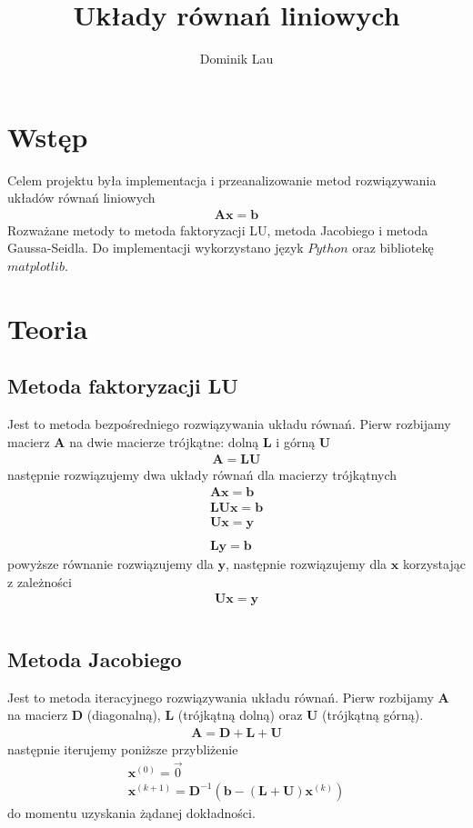 \documentclass{article}
\title{Układy równań liniowych}
\author{Dominik Lau}
\begin{document}
\maketitle
\section{Wstęp}
Celem projektu była implementacja i przeanalizowanie metod rozwiązywania układów równań liniowych
\begin{gather*}
	\boldsymbol{A}\boldsymbol{x} = \boldsymbol{b}
\end{gather*}
Rozważane metody to metoda faktoryzacji LU, metoda Jacobiego i metoda Gaussa-Seidla.  
Do implementacji wykorzystano język $Python$ oraz bibliotekę $matplotlib$.
\section{Teoria}
\subsection*{Metoda faktoryzacji LU}
Jest to metoda bezpośredniego rozwiązywania układu równań.  Pierw rozbijamy macierz $\textbf{A}$
na dwie macierze trójkątne: dolną $\textbf{L}$ i górną $\textbf{U}$
\begin{gather*}
	\boldsymbol{A} = \boldsymbol{L}\boldsymbol{U}
\end{gather*}
następnie rozwiązujemy dwa układy równań dla macierzy trójkątnych
\begin{gather*}
	\boldsymbol{A}\boldsymbol{x} = \boldsymbol{b}\\
	 \boldsymbol{L} \boldsymbol{U}  \boldsymbol{x} =  \boldsymbol{b} \\
	 \boldsymbol{Ux} =  \boldsymbol{y}  \\\\
	 \boldsymbol{L}  \boldsymbol{y} =   \boldsymbol{b}
\end{gather*}
powyższe równanie rozwiązujemy dla $ \boldsymbol{y}$, następnie rozwiązujemy dla $\boldsymbol{x}$
korzystając z zależności
\begin{gather*}
	\boldsymbol{Ux} =  \boldsymbol{y}  \\\\
\end{gather*}
\subsection*{Metoda Jacobiego}
Jest to metoda iteracyjnego rozwiązywania układu równań. Pierw rozbijamy $\boldsymbol{A}$
na macierz $\boldsymbol{D}$ (diagonalną), $\boldsymbol{L}$ (trójkątną dolną) oraz $\boldsymbol{U}$ 
(trójkątną górną).
\begin{gather*}
	\boldsymbol{A} = \boldsymbol{D} + \boldsymbol{L} + \boldsymbol{U}
\end{gather*}
następnie iterujemy poniższe przybliżenie
\begin{gather*}
	\boldsymbol{x}^{(0)} = \vec{0} \\
	\boldsymbol{x}^{(k+1)} = \boldsymbol{D}^{-1}(\boldsymbol{b} - (
\boldsymbol{L} + \boldsymbol{U})\boldsymbol{x}^{(k)})
\end{gather*}
do momentu uzyskania żądanej dokładności.
\end{document}

